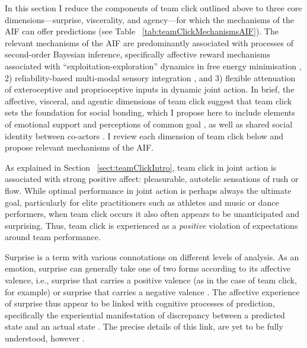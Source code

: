 \begin{CJK}{UTF8}{gbsn}
In this section I reduce the components of team click outlined above to three core dimensions---surprise, viscerality, and agency---for which the mechanisms of the AIF can offer predictions (see Table ~\ref{tab:teamClickMechanismsAIF}).  The relevant mechanisms of the AIF are predominantly associated with processes of second-order Bayesian inference, specifically affective reward mechanisms associated with ``exploitation-exploration'' dynamics in free energy minimisation \citep{Friston2012,Schwartenbeck2013,FitzGerald2014,Chetverikov2016}, 2) reliability-based multi-modal sensory integration \citep{Ernst2004}, and 3) flexible attenuation ~\citep{Frith2007,Friston2015} of exteroceptive and proprioceptive inputs in dynamic joint action.  In brief, the affective, visceral, and agentic dimensions of team click suggest that team click sets the foundation for social bonding, which I propose here to include elements of emotional support and perceptions of common goal \citep[cf.][]{Dunbar2012,Wolf2015}, as well as shared social identity between co-actors \citep{Whitehouse2014}.  I review each dimension of team click below and propose relevant mechanisms of the AIF.




As explained in Section ~\ref{sect:teamClickIntro}, team click in joint action is associated with strong positive affect: pleasurable, autotelic sensations of rush or flow.  While optimal performance in joint action is perhaps always the ultimate goal, particularly for elite practitioners such as athletes and music or dance performers, when team click occurs it also often appears to be unanticipated and surprising.  Thus, team click is experienced as a \textit{positive} violation of expectations around team performance.

Surprise is a term with various connotations on different levels of analysis.  As an emotion, surprise can generally take one of two forms according to its affective valence, i.e., surprise that carries a positive valence (as in the case of team click, for example) or surprise that carries a negative valence  \citep[in the case of shock or fright][]{Chetverikov2014}.  The affective experience of surprise thus appear to be linked with cognitive processes of prediction, specifically the experiential manifestation of discrepancy between a predicted state and an actual state \citep{Foster2015}.  The precise details of this link, are yet to be fully understood, however \citep{Schwartenbeck2013}.


\end{CJK}
